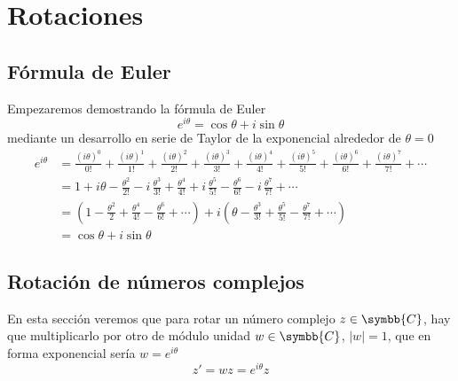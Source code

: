 %

\chapter{Rotaciones}

\section{Fórmula de Euler}\label{sect:rot-taylor}
Empezaremos demostrando la fórmula de Euler
\begin{equation}\label{eq:rot-Euler}
  e^{i\theta} = \cos\theta + i \sin\theta
\end{equation}
mediante un desarrollo en serie de Taylor de la exponencial alrededor de
$\theta=0$
\begin{align*} 
  e^{i\theta}
  &=
    \frac{(i\theta)^0}{0!}
    + \frac{(i\theta)^1}{1!}
    + \frac{(i\theta)^2}{2!}
    + \frac{(i\theta)^3}{3!}
    + \frac{(i\theta)^4}{4!}
    + \frac{(i\theta)^5}{5!}
    + \frac{(i\theta)^6}{6!}
    + \frac{(i\theta)^7}{7!}
    + \cdots\\
  &=
    1
    + i\theta
    - \frac{\theta^2}{2!}
    - i\,\frac{\theta^3}{3!}
    + \frac{\theta^4}{4!}
    + i\,\frac{\theta^5}{5!}
    - \frac{\theta^6}{6!}
    - i\,\frac{\theta^7}{7!}
    + \cdots\\
  &=
    \left(
    1 - \frac{\theta^2}{2} + \frac{\theta^4}{4!} - \frac{\theta^6}{6!}
    + \cdots
    \right)
    + i\left(
    \theta - \frac{\theta^3}{3!} + \frac{\theta^5}{5!} - \frac{\theta^7}{7!}
    + \cdots
    \right)\\
  &=
    \cos\theta + i \sin\theta
\end{align*}

\section{Rotación de números complejos}
En esta sección veremos que para rotar un número complejo $z\in\symbb{C}$,
hay que multiplicarlo por otro de módulo unidad
$w\in\symbb{C}$, $|w|=1$, que en forma exponencial sería
$w=e^{i\theta}$
\begin{equation}\label{eq:rot-rotacion-complejo}
  z' = w z = e^{i\theta} z
\end{equation}

